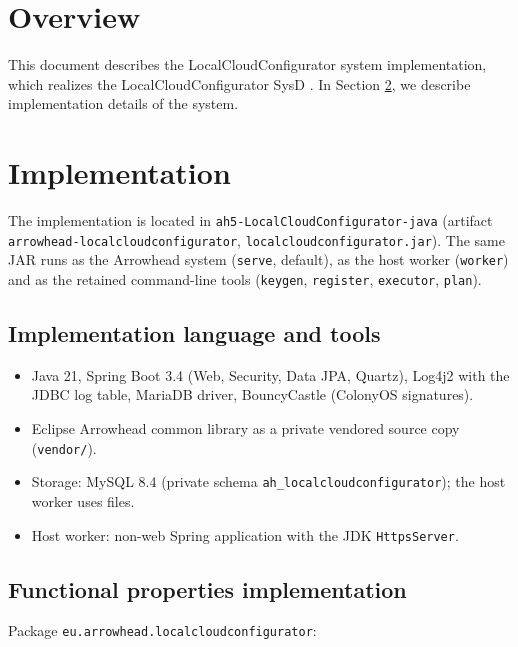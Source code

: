 \documentclass[a4paper]{arrowhead}
\begin{document}
\section{Overview}
\label{sec:overview}

This document describes the LocalCloudConfigurator system implementation, which realizes the LocalCloudConfigurator SysD \cite{lcc-sysd}.
In Section \ref{Implementation}, we describe implementation details of the system.

\newpage

\section{Implementation}
\label{Implementation}

The implementation is located in \texttt{ah5-LocalCloudConfigurator-java} (artifact \texttt{arrowhead-\allowbreak{}localcloudconfigurator}, \texttt{localcloudconfigurator.\allowbreak{}jar}). The same JAR runs as the Arrowhead system (\texttt{serve}, default), as the host worker (\texttt{worker}) and as the retained command-line tools (\texttt{keygen}, \texttt{register}, \texttt{executor}, \texttt{plan}).

\subsection{Implementation language and tools}
\begin{itemize}
\item Java 21, Spring Boot 3.4 (Web, Security, Data JPA, Quartz), Log4j2 with the JDBC log table, MariaDB driver, BouncyCastle (ColonyOS signatures).
\item Eclipse Arrowhead common library as a private vendored source copy (\texttt{vendor/}).
\item Storage: MySQL 8.4 (private schema \texttt{ah\_\allowbreak{}localcloudconfigurator}); the host worker uses files.
\item Host worker: non-web Spring application with the JDK \texttt{HttpsServer}.
\end{itemize}

\subsection{Functional properties implementation}

Package \texttt{eu.\allowbreak{}arrowhead.\allowbreak{}localcloudconfigurator}:
\end{document}
